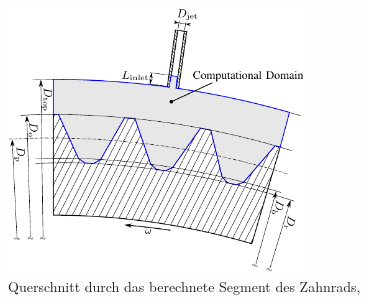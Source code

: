 
\begin{figure}[h]
	\centering
	\def\svgwidth{0.6\columnwidth}
	\includegraphics[width=0.7\textwidth]{bilder/keller_2016.pdf}
	\caption{Querschnitt durch das berechnete Segment des Zahnrads, \cite{keller2016}}
	\label{GRAPHIC:DomainKeller}
\end{figure}



